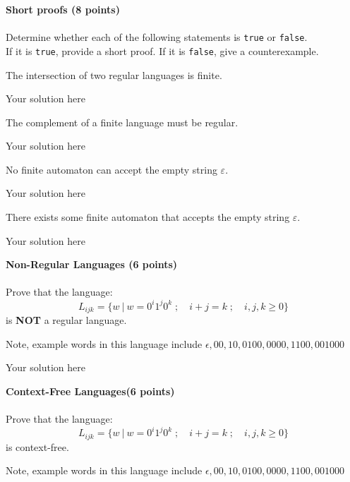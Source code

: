 \documentclass[12pt]{article}
\newenvironment{question}[2][Question]{\begin{trivlist}
\item[\hskip \labelsep {\bfseries #1}\hskip \labelsep {\bfseries #2.}]}{\end{trivlist}}
\newenvironment{solution}[1][Solution:]{\begin{trivlist}
\item[\hskip \labelsep {\bfseries #1}\hskip \labelsep {\bfseries}]\color{blue}}{\end{trivlist}}
\begin{document}
\clearpage
\begin{question}{7}\textbf{Short proofs (8 points)}\\\\

Determine whether each of the following statements is \texttt{true} or \texttt{false}.\\ If it is \texttt{true}, provide a short proof. If it is \texttt{false}, give a counterexample.
\begin{enumerate}[(a)]
\item The intersection of two regular languages is finite.
\begin{solution}
    Your solution here
\end{solution}

\item The complement of a finite language must be regular.
\begin{solution}
    Your solution here
\end{solution}

\item No finite automaton can accept the empty string $\varepsilon$.
\begin{solution}
   Your solution here
\end{solution}

\item There exists some finite automaton that accepts the empty string $\varepsilon$.
\begin{solution}
    Your solution here   
\end{solution}
\end{enumerate}
\end{question}

\clearpage
\begin{question}{8}\textbf{Non-Regular Languages (6 points)}\\\\

Prove that the language: \[L_{ijk} = \{w \ | \ w = 0^i1^j0^k \; ; \quad i+j = k \; ; \quad i,j,k \geq 0 \} \] is \textbf{NOT} a regular language.

Note, example words in this language include $\epsilon, 00, 10, 0100, 0000, 1100, 001000$
\end{question}

\begin{solution}
Your solution here  
\end{solution}

\clearpage
\begin{question}{9}\textbf{Context-Free Languages(6 points)} \\\\

Prove that the language: \[L_{ijk} = \{w \ | \ w = 0^i1^j0^k \; ; \quad i+j = k \; ; \quad i,j,k \geq 0 \} \] is context-free.

Note, example words in this language include $\epsilon, 00, 10, 0100, 0000, 1100, 001000$
\end{question}
\end{document}
